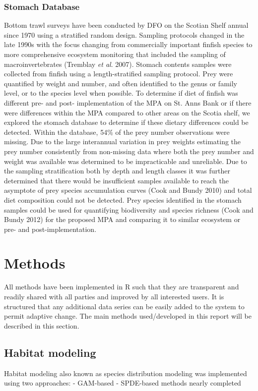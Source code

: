\documentclass[letterpaper,portrait,11pt]{scrartcl}
\numberwithin{equation}{section}		%
\numberwithin{figure}{section}			%
\numberwithin{table}{section}				%
\begin{document}
\subsubsection{Stomach Database}
Bottom trawl surveys have been conducted by DFO on the Scotian Shelf annual since 1970 using a stratified random design.  Sampling protocols changed in the late 1990s with the focus changing from commercially important finfish species to more comprehensive ecosystem monitoring that included the sampling of macroinvertebrates (Tremblay \textit{et al}. 2007).  Stomach contents samples were collected from finfish using a length-stratified sampling protocol.  Prey were quantified by weight and number, and often identified to the genus or family level, or to the species level when possible.  To determine if diet of finfish was different pre- and post- implementation of the MPA on St. Anns Bank or if there were differences within the MPA compared to other areas on the Scotia shelf, we explored the stomach database to determine if these dietary differences could be detected. Within the database, 54\% of the prey number observations were missing.  Due to the large interannual variation in prey weights estimating the prey number consistently from non-missing data where both the prey number and weight was available was determined to be impracticable and unreliable.  Due to the sampling stratification both by depth and length classes it was further determined that there would be insufficient samples available to reach the asymptote of prey species accumulation curves (Cook and Bundy 2010) and total diet composition could not be detected.  Prey species identified in the stomach samples could be used for quantifying biodiversity and species richness (Cook and Bundy 2012) for the proposed MPA and comparing it to similar ecosystem or pre- and post-implementation.

\section{Methods}
All methods have been implemented in R such that they are transparent and readily shared with all parties and improved by all interested users. It is structured that any additional data series can be easily added to the system to permit adaptive change.
The main methods used/developed in this report will be described in this section.

\subsection{Habitat modeling}
Habitat  modeling also known as species distribution modeling was implemented using two approaches: 
- GAM-based 
- SPDE-based methods nearly completed
\end{document}
